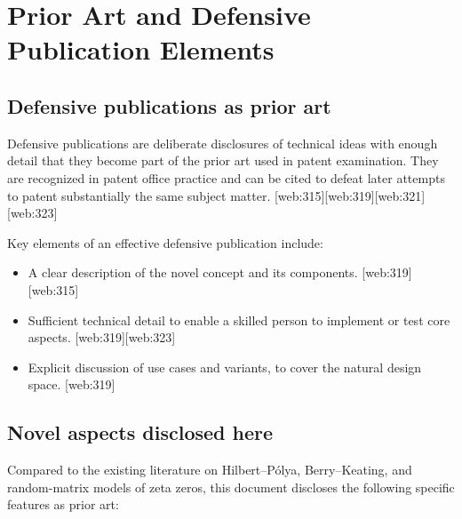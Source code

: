 \documentclass[11pt]{article}
\begin{document}
\section{Prior Art and Defensive Publication Elements}

\subsection{Defensive publications as prior art}

Defensive publications are deliberate disclosures of technical ideas with enough detail that they become part of the prior art used in patent examination.  They are recognized in patent office practice and can be cited to defeat later attempts to patent substantially the same subject matter. [web:315][web:319][web:321][web:323]

Key elements of an effective defensive publication include:
\begin{itemize}
  \item A clear description of the novel concept and its components. [web:319][web:315]
  \item Sufficient technical detail to enable a skilled person to implement or test core aspects. [web:319][web:323]
  \item Explicit discussion of use cases and variants, to cover the natural design space. [web:319]
\end{itemize}

\subsection{Novel aspects disclosed here}

Compared to the existing literature on Hilbert--Pólya, Berry--Keating, and random-matrix models of zeta zeros, this document discloses the following specific features as prior art:
\end{document}
